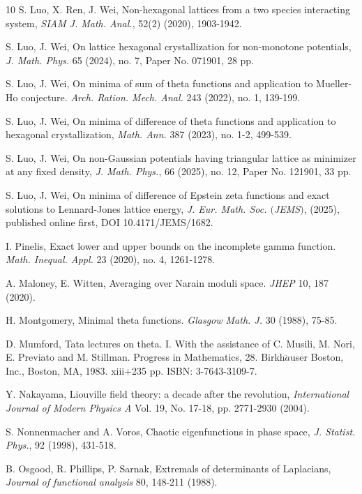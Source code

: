 \documentclass[reqno,english]{amsart}
\newtheorem{open problem}{Open Problem}[section]
\newtheorem{open question}{Open Question}[section]
\newtheorem{open questions on hexagonal lattice}{Open Questions on hexagonal lattice}[section]
\begin{document}
\begin{thebibliography}{10}
 S. Luo, X. Ren, J. Wei,
Non-hexagonal lattices from a two species interacting system, {\em SIAM J. Math. Anal.}, 52(2) (2020), 1903-1942.

 S. Luo, J. Wei, On lattice hexagonal crystallization for non-monotone potentials, {\em J. Math. Phys.} 65 (2024), no. 7, Paper No. 071901, 28 pp.

  S. Luo, J. Wei, On minima of sum of theta functions and application to Mueller-Ho conjecture. {\em Arch. Ration. Mech. Anal.} 243 (2022), no. 1, 139-199.


  S. Luo, J. Wei, On minima of difference of theta functions and application to hexagonal crystallization, {\em Math. Ann.} 387 (2023), no. 1-2, 499-539.

  S. Luo, J. Wei, On non-Gaussian potentials having triangular lattice as minimizer at any fixed density, {\em J. Math. Phys.}, 66 (2025), no. 12, Paper No. 121901, 33 pp.

  S. Luo, J. Wei,
On minima of difference of Epstein zeta functions and exact solutions to Lennard-Jones lattice energy,  {\em J. Eur. Math. Soc. $($JEMS$)$}, (2025), published online first, DOI 10.4171/JEMS/1682.


I. Pinelis, Exact lower and upper bounds on the incomplete gamma function. {\em Math. Inequal. Appl.} 23 (2020), no. 4, 1261-1278.

 A. Maloney, E. Witten, Averaging over Narain moduli space. {\it JHEP} 10, 187 (2020).


H. Montgomery, Minimal theta functions. {\em Glasgow Math. J.} 30 (1988), 75-85.

D. Mumford, Tata lectures on theta. I. With the assistance of C. Musili, M. Nori, E. Previato and M. Stillman. Progress in Mathematics, 28. Birkh$\ddot{a}$user Boston, Inc., Boston, MA, 1983. xiii+235 pp. ISBN: 3-7643-3109-7.


 Y. Nakayama, Liouville field theory: a decade after the revolution, {\em International Journal of Modern Physics A} Vol. 19, No. 17-18, pp. 2771-2930 (2004).

 S. Nonnenmacher and A. Voros, Chaotic eigenfunctions in phase space, {\em J. Statist. Phys.}, 92 (1998), 431-518.

 B. Osgood, R. Phillips, P. Sarnak,
Extremals of determinants of Laplacians, {\em Journal of functional analysis} 80, 148-211 (1988).


\end{thebibliography}
\end{document}
